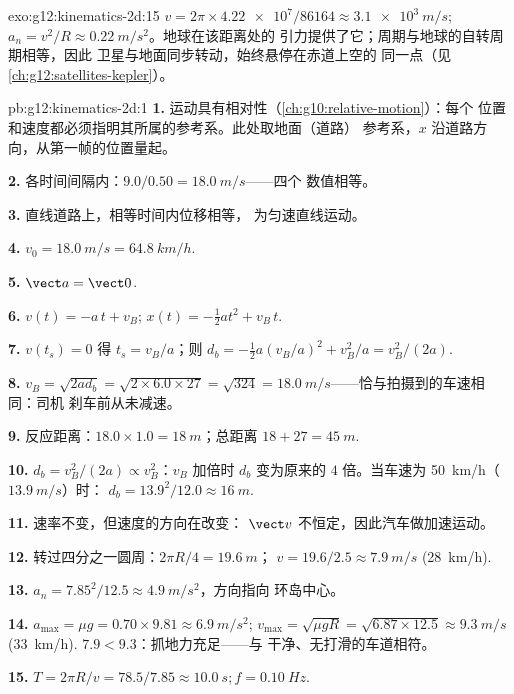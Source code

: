 \begin{solution}{exo:g12:kinematics-2d:15}
$v = 2\pi \times \num{4.22e7}/\num{86164} \approx \qty{3.1e3}{m/s}$;
$a_n = v^2/R \approx \qty{0.22}{m/s^2}$。地球在该距离处的
引力提供了它；周期与地球的自转周期相等，因此
卫星与地面同步转动，始终悬停在赤道上空的
同一点（见\cref{ch:g12:satellites-kepler}）。
\end{solution}

\begin{solution}{pb:g12:kinematics-2d:1}
\textbf{1.} 运动具有相对性（\cref{ch:g10:relative-motion}）：每个
位置和速度都必须指明其所属的参考系。此处取地面（道路）
参考系，$x$ 沿道路方向，从第一帧的位置量起。

\textbf{2.} 各时间间隔内：$9.0/0.50 = \qty{18.0}{m/s}$——四个
数值相等。

\textbf{3.} 直线道路上，相等时间内位移相等，
为匀速直线运动。

\textbf{4.} $v_0 = \qty{18.0}{m/s} = \qty{64.8}{km/h}$.

\textbf{5.} $\vect a = \vect 0$.

\textbf{6.} $v(t) = -a\,t + v_B$; $x(t) = -\tfrac12 a t^2 + v_B\,t$.

\textbf{7.} $v(t_s) = 0$ 得 $t_s = v_B/a$；则
$d_b = -\tfrac12 a (v_B/a)^2 + v_B^2/a = v_B^2/(2a)$.

\textbf{8.} $v_B = \sqrt{2 a d_b} = \sqrt{2 \times 6.0 \times 27} =
\sqrt{324} = \qty{18.0}{m/s}$——恰与拍摄到的车速相同：司机
刹车前从未减速。

\textbf{9.} 反应距离：$18.0 \times 1.0 = \qty{18}{m}$；总距离
$18 + 27 = \qty{45}{m}$.

\textbf{10.} $d_b = v_B^2/(2a) \propto v_B^2$：$v_B$ 加倍时
$d_b$ 变为原来的 $4$ 倍。当车速为 \qty{50}{km/h}（$\qty{13.9}{m/s}$）时：
$d_b = 13.9^2/12.0 \approx \qty{16}{m}$.

\textbf{11.} 速率不变，但速度的方向在改变：
$\vect v$ 不恒定，因此汽车做加速运动。

\textbf{12.} 转过四分之一圆周：$2\pi R/4 = \qty{19.6}{m}$；
$v = 19.6/2.5 \approx \qty{7.9}{m/s}$ (\qty{28}{km/h}).

\textbf{13.} $a_n = 7.85^2/12.5 \approx \qty{4.9}{m/s^2}$，方向指向
环岛中心。

\textbf{14.} $a_{\max} = \mu g = 0.70 \times 9.81 \approx
\qty{6.9}{m/s^2}$; $v_{\max} = \sqrt{\mu g R} =
\sqrt{6.87 \times 12.5} \approx \qty{9.3}{m/s}$ (\qty{33}{km/h}).
$7.9 < 9.3$：抓地力充足——与
干净、无打滑的车道相符。

\textbf{15.} $T = 2\pi R/v = 78.5/7.85 \approx \qty{10.0}{s};
f = \qty{0.10}{Hz}$.


\end{solution}
